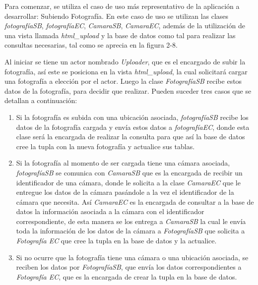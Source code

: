 \documentclass{memoria}
\begin{document}
Para comenzar, se utiliza el caso de uso más representativo de la aplicación a desarrollar: Subiendo Fotografía. En este caso de uso se utilizan las clases \textsl{fotografíaSB}, \textsl{fotografíaEC}, \textsl{CamaraSB}, \textsl{CamaraEC}, además de la utilización de una vista llamada \textsl{html\_upload} y la base de datos como tal para realizar las consultas necesarias, tal como se aprecia en la figura 2-8.

Al iniciar se tiene un actor nombrado \textsl{Uploader}, que es el encargado de subir la fotografía, así este se posiciona en la vista \textsl{html\_upload}, la cual solicitará cargar una fotografía a elección por el actor. Luego la clase \textsl{FotografíaSB} recibe estos datos de la fotografía, para decidir que realizar. Pueden suceder tres casos que se detallan a continuación:

\begin{enumerate}
\item Si la fotografía es subida con una ubicación asociada, \textsl{fotografíaSB} recibe los datos de la fotografía cargada y envía estos datos a \textsl{fotografíaEC}, donde esta clase será la encargada de realizar la consulta para que así la base de datos cree la tupla con la nueva fotografía y actualice sus tablas.

\item Si la fotografía al momento de ser cargada tiene una cámara asociada, \textsl{fotografíaSB} se comunica con \textsl{CamaraSB} que es la encargada de recibir un identificador de una cámara, donde le solicita a la clase \textsl{CamaraEC} que le entregue los datos de la cámara pasándole a la vez el identificador de la cámara que necesita. Así \textsl{CamaraEC} es la encargada de consultar a la base de datos la información asociada a la cámara con el identificador correspondiente, de esta manera se los entrega a \textsl{CamaraSB} la cual le envía toda la información de los datos de la cámara a \textsl{FotografíaSB} que solicita a \textsl{Fotografía EC} que cree la tupla en la base de datos y la actualice.

\item Si no ocurre que la fotografía tiene una cámara o una ubicación asociada, se reciben los datos por \textsl{FotografíaSB}, que envía los datos correspondientes a \textsl{Fotografía EC}, que es la encargada de crear la tupla en la base de datos.
\end{enumerate}

\newpage
{}
\end{document}
